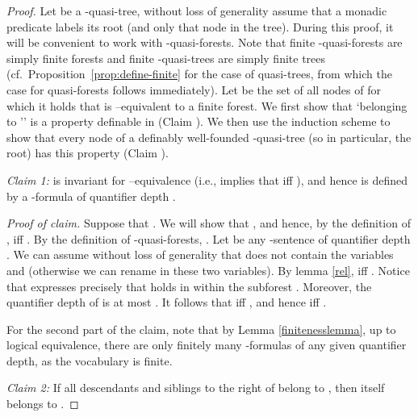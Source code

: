 \documentclass{LMCS}
\newenvironment{proofofclaim}{\begin{trivlist}\item\textit{Proof of claim.}}{\hfill\end{trivlist}}
\begin{document}
\begin{proof}
  Let  be a -quasi-tree, without loss of generality assume that a monadic predicate  labels its root (and only that node in the tree). During this proof, it will be convenient to work with
  -quasi-forests. Note that finite -quasi-forests
  are simply finite forests and finite -quasi-trees are
  simply finite trees (cf.~Proposition~\ref{prop:define-finite} for
  the case of quasi-trees, from which the case for quasi-forests
  follows immediately). Let  be the set of all nodes  of  for
  which it holds that  is --equivalent to a finite
  forest. We first show that `belonging to '' is a property definable in  (Claim ).
  We then use the induction scheme to show that every node of a definably well-founded -quasi-tree (so in particular, the root) has this property (Claim ).
  \medskip\par\noindent\emph{Claim 1:}
     is invariant for --equivalence (i.e.,
     implies that  iff ), and
    hence is defined by a -formula of
    quantifier depth .


  \begin{proofofclaim}
    Suppose that .
    We will show that , and hence, by the
    definition of ,  iff .
     By the definition of -quasi-forests, . Let  be any -sentence of quantifier depth . We can assume without loss of generality that  does not contain the variables  and  (otherwise we can rename in  these two variables). By lemma \ref{rel},  iff .
    Notice that  expresses precisely that 
    holds in  within the subforest . Moreover, the quantifier depth of
     is at most . It follows that 
    iff , and hence  iff
    .

    For the second part of the claim, note that by Lemma \ref{finitenesslemma}, up to logical equivalence, there are only
    finitely many -formulas of any given quantifier depth,
    as the vocabulary is finite.
  \end{proofofclaim}



  \smallskip\par\noindent\emph{Claim 2:} If all descendants and siblings
  to the right of  belong to , then  itself
  belongs to .


\end{proof}
\end{document}
